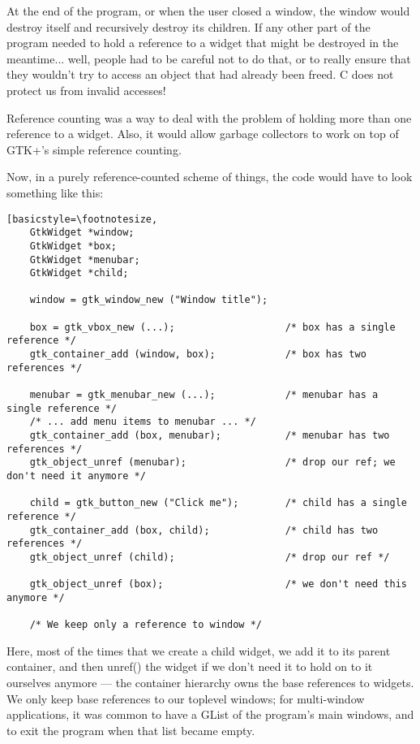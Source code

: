 At the end of the program, or when the user closed a window, the
window would destroy itself and recursively destroy its children.  If
any other part of the program needed to hold a reference to a widget
that might be destroyed in the meantime... well, people had to be
careful not to do that, or to really ensure that they wouldn't try to
access an object that had already been freed.  C does not protect us
from invalid accesses!

Reference counting was a way to deal with the problem of holding more
than one reference to a widget.  Also, it would allow garbage
collectors to work on top of GTK+'s simple reference counting.

Now, in a purely reference-counted scheme of things, the code would
have to look something like this:

\begin{lstlisting}[basicstyle=\footnotesize,
    GtkWidget *window;
    GtkWidget *box;
    GtkWidget *menubar;
    GtkWidget *child;

    window = gtk_window_new ("Window title");

    box = gtk_vbox_new (...);                   /* box has a single reference */
    gtk_container_add (window, box);            /* box has two references */

    menubar = gtk_menubar_new (...);            /* menubar has a single reference */
    /* ... add menu items to menubar ... */
    gtk_container_add (box, menubar);           /* menubar has two references */
    gtk_object_unref (menubar);                 /* drop our ref; we don't need it anymore */

    child = gtk_button_new ("Click me");        /* child has a single reference */
    gtk_container_add (box, child);             /* child has two references */
    gtk_object_unref (child);                   /* drop our ref */

    gtk_object_unref (box);                     /* we don't need this anymore */ 

    /* We keep only a reference to window */
\end{lstlisting}

Here, most of the times that we create a child widget, we add it to
its parent container, and then unref() the widget if we don't need it
to hold on to it ourselves anymore --- the container hierarchy owns
the base references to widgets.  We only keep base references to our
toplevel windows; for multi-window applications, it was common to have
a GList of the program's main windows, and to exit the program when
that list became empty.

